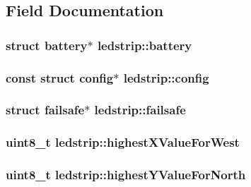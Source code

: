 \subsection{Field Documentation}
\hypertarget{structledstrip_aba6cb5cdf50f1b2ac4c834193db5a4d3}{
\subsubsection[{battery}]{\setlength{\rightskip}{0pt plus 5cm}struct {\bf battery}$\ast$ ledstrip\+::battery}}\label{structledstrip_aba6cb5cdf50f1b2ac4c834193db5a4d3}
\hypertarget{structledstrip_adb814be629218d849959fed8240c4476}{
\subsubsection[{config}]{\setlength{\rightskip}{0pt plus 5cm}const struct {\bf config}$\ast$ ledstrip\+::config}}\label{structledstrip_adb814be629218d849959fed8240c4476}
\hypertarget{structledstrip_a3ed8fe5023777c44893e984b4b3abf99}{
\subsubsection[{failsafe}]{\setlength{\rightskip}{0pt plus 5cm}struct {\bf failsafe}$\ast$ ledstrip\+::failsafe}}\label{structledstrip_a3ed8fe5023777c44893e984b4b3abf99}
\hypertarget{structledstrip_a513a585945a1f2d727c768fb6ca982a5}{
\subsubsection[{highest\+X\+Value\+For\+West}]{\setlength{\rightskip}{0pt plus 5cm}uint8\+\_\+t ledstrip\+::highest\+X\+Value\+For\+West}}\label{structledstrip_a513a585945a1f2d727c768fb6ca982a5}
\hypertarget{structledstrip_a4229538210bf143752c0c1028033329d}{
\subsubsection[{highest\+Y\+Value\+For\+North}]{\setlength{\rightskip}{0pt plus 5cm}uint8\+\_\+t ledstrip\+::highest\+Y\+Value\+For\+North}}\label{structledstrip_a4229538210bf143752c0c1028033329d}
